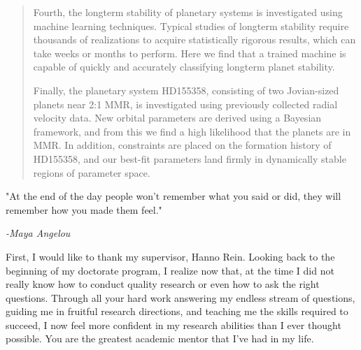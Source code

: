 \documentclass[letterpaper]{ut-thesis} %
\begin{document}
\begin{preliminary}
\begin{abstract}
Fourth, the longterm stability of planetary systems is investigated using machine learning techniques.
Typical studies of longterm stability require thousands of realizations to acquire statistically rigorous results, which can take weeks or months to perform. 
Here we find that a trained machine is capable of quickly and accurately classifying longterm planet stability. 
 
Finally, the planetary system HD155358, consisting of two Jovian-sized planets near 2:1 MMR, is investigated using previously collected radial velocity data. 
New orbital parameters are derived using a Bayesian framework, and from this we find a high likelihood that the planets are in MMR.
In addition, constraints are placed on the formation history of HD155358, and our best-fit parameters land firmly in dynamically stable regions of parameter space. 
 
\end{abstract}
\cleardoublepage



\vspace*{\fill}
\begin{center}
\begin{minipage}[c]{4.75in}
 "At the end of the day people won't remember what you said or did, they will remember how you made them feel." \vspace{1em}
 
\hfill \emph{-Maya Angelou}


\end{minipage}
\end{center}
\vspace*{\fill}

\cleardoublepage

\begin{acknowledgements}
First, I would like to thank my supervisor, Hanno Rein. 
Looking back to the beginning of my doctorate program, I realize now that, at the time I did not really know how to conduct quality research or even how to ask the right questions.
Through all your hard work answering my endless stream of questions, guiding me in fruitful research directions, and teaching me the skills required to succeed, I now feel more confident in my research abilities than I ever thought possible. 
You are the greatest academic mentor that I've had in my life.


\end{acknowledgements}
\end{preliminary}
\end{document}
